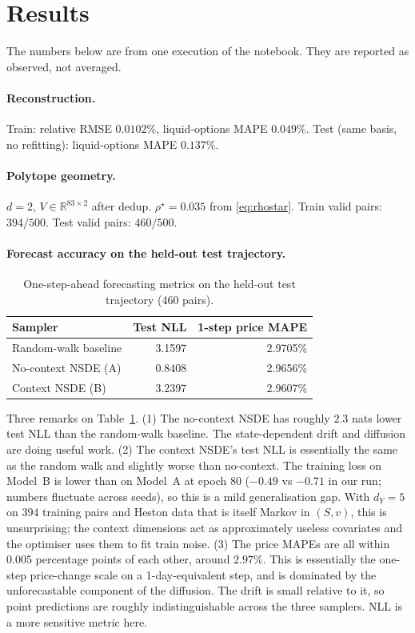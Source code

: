 \documentclass[11pt]{article}
\newcommand{\R}{\mathbb{R}}
\newcommand{\1}{\mathbf{1}}
\begin{document}
\section{Results}

The numbers below are from one execution of the notebook. They are reported as observed, not averaged.

\paragraph{Reconstruction.}
Train: relative RMSE $0.0102\%$, liquid-options MAPE $0.049\%$.
Test (same basis, no refitting): liquid-options MAPE $0.137\%$.

\paragraph{Polytope geometry.}
$d = 2$, $V \in \R^{83 \times 2}$ after dedup. $\rho^\star = 0.035$ from \eqref{eq:rhostar}.
Train valid pairs: $394 / 500$. Test valid pairs: $460 / 500$.

\paragraph{Forecast accuracy on the held-out test trajectory.}

\begin{table}[h]
\centering
\begin{tabular}{lrr}
\toprule
Sampler & Test NLL & 1-step price MAPE \\
\midrule
Random-walk baseline    &  3.1597 & 2.9705\% \\
No-context NSDE (A)     &  0.8408 & 2.9656\% \\
Context NSDE (B)        &  3.2397 & 2.9607\% \\
\bottomrule
\end{tabular}
\caption{One-step-ahead forecasting metrics on the held-out test trajectory (460 pairs).}
\label{tab:forecast}
\end{table}

Three remarks on Table~\ref{tab:forecast}.
(1) The no-context NSDE has roughly $2.3$ nats lower test NLL than the random-walk baseline. The state-dependent drift and diffusion are doing useful work.
(2) The context NSDE's test NLL is essentially the same as the random walk and slightly worse than no-context. The training loss on Model~B is lower than on Model~A at epoch 80 ($-0.49$ vs $-0.71$ in our run; numbers fluctuate across seeds), so this is a mild generalisation gap. With $d_Y = 5$ on $394$ training pairs and Heston data that is itself Markov in $(S, v)$, this is unsurprising; the context dimensions act as approximately useless covariates and the optimiser uses them to fit train noise.
(3) The price MAPEs are all within $0.005$ percentage points of each other, around $2.97\%$. This is essentially the one-step price-change scale on a 1-day-equivalent step, and is dominated by the unforecastable component of the diffusion. The drift is small relative to it, so point predictions are roughly indistinguishable across the three samplers. NLL is a more sensitive metric here.
\end{document}
